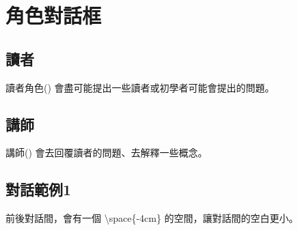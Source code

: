 \documentclass{article}
\begin{document}
\section{角色對話框}

\subsection{讀者}
讀者角色(\readerName) 會盡可能提出一些讀者或初學者可能會提出的問題。

\vspace{2cm} %

\subsection{講師}
講師(\teacherName) 會去回覆讀者的問題、去解釋一些概念。
\vspace{2cm} %

\break
\subsection{對話範例1}
前後對話間，會有一個 \textbackslash space\{-4cm\} 的空間，讓對話間的空白更小。
\vspace{-4cm}

\begin{textRight}\begin{readerSaid}
\lipsum[1]
\end{readerSaid}\end{textRight}

\begin{textLeft}\begin{teacherSaid}
\lipsum[1]
\end{teacherSaid}\end{textLeft}


\break
\end{document}
